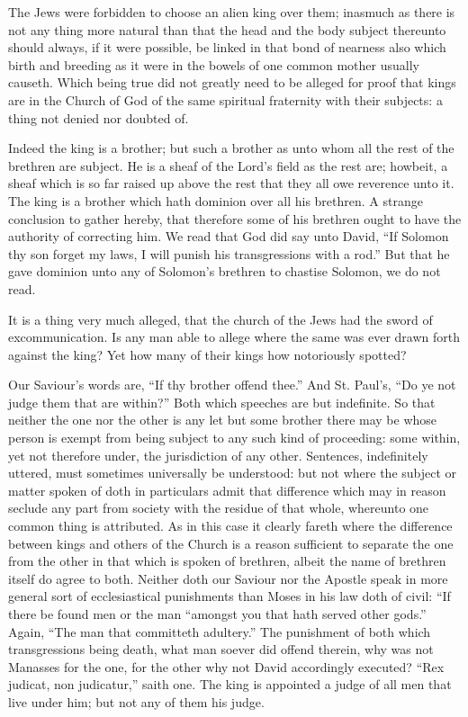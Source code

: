 The Jews were forbidden to choose an alien king over them; inasmuch as there is not any thing more natural than that the head and the body subject thereunto should always, if it were possible, be linked in that bond of nearness also which birth and breeding as it were in the bowels of one common mother usually causeth. Which being true did not greatly need to be alleged for proof that kings are in the Church of God of the same spiritual fraternity with their subjects: a thing not denied nor doubted of.

Indeed the king is a brother; but such a brother as unto whom all the rest of the brethren are subject. He is a sheaf of the Lord’s field as the rest are; howbeit, a sheaf which is so far raised up above the rest that they all owe reverence unto it. The king is a brother which hath dominion over all his brethren. A strange conclusion to gather hereby, that therefore some of his brethren ought to have the authority of correcting him. We read that God did say unto David, “If Solomon thy son forget my laws, I will punish his transgressions with a rod.” But that he gave dominion unto any of Solomon’s brethren to chastise Solomon, we do not read.

It is a thing very much alleged, that the church of the Jews had the sword of excommunication. Is any man able to allege where the same was ever drawn forth against the king? Yet how many of their kings how notoriously spotted?

Our Saviour’s words are, “If thy brother offend thee.” And St. Paul’s, “Do ye not judge them that are within?” Both which speeches are but indefinite. So that neither the one nor the other is any let but some brother there may be  whose person is exempt from being subject to any such kind of proceeding: some within, yet not therefore under, the jurisdiction of any other. Sentences, indefinitely uttered, must sometimes universally be understood: but not where the subject or matter spoken of doth in particulars admit that difference which may in reason seclude any part from society with the residue of that whole, whereunto one common thing is attributed. As in this case it clearly fareth where the difference between kings and others of the Church is a reason sufficient to separate the one from the other in that which is spoken of brethren, albeit the name of brethren itself do agree to both. Neither doth our Saviour nor the Apostle speak in more general sort of ecclesiastical punishments than Moses in his law doth of civil: “If there be found men or the man “amongst you that hath served other gods.” Again, “The man that committeth adultery.” The punishment of both which transgressions being death, what man soever did offend therein, why was not Manasses for the one, for the other why not David accordingly executed? “Rex judicat, non judicatur,” saith one. The king is appointed a judge of all men that live under him; but not any of them his judge.

